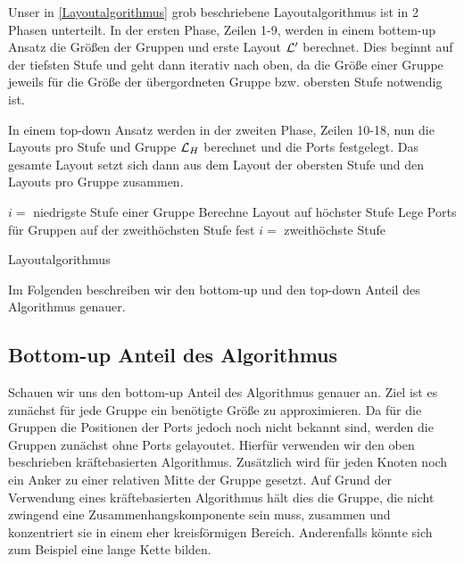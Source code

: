 Unser in \autoref{Layoutalgorithmus} grob beschriebene Layoutalgorithmus ist in 2 Phasen unterteilt. 
In der ersten Phase, Zeilen 1-9, werden in einem bottem-up Ansatz die Größen der Gruppen und erste Layout $\mathcal{L}'$ berechnet. 
Dies beginnt auf der tiefsten Stufe und geht dann iterativ nach oben, da die Größe einer Gruppe jeweils für die Größe der übergordneten Gruppe bzw. obersten Stufe notwendig ist.

In einem top-down Ansatz werden in der zweiten Phase, Zeilen 10-18, nun die Layouts pro Stufe und Gruppe $\mathcal{L}_H$ berechnet und die Ports festgelegt. Das gesamte Layout setzt 
sich dann aus dem Layout der obersten Stufe und den Layouts pro Gruppe zusammen.

\begin{algorithm}[H]
\label{Layoutalgorithmus}
\SetAlgoLined
{} %
$i =$ niedrigste Stufe einer Gruppe\;
Berechne Layout auf höchster Stufe\;
Lege Ports für Gruppen auf der zweithöchsten Stufe fest\;
$i =$ zweithöchste Stufe\; 
\caption{Layoutalgorithmus}
\end{algorithm}

Im Folgenden beschreiben wir den bottom-up und den top-down Anteil des Algorithmus genauer. 

\subsection{Bottom-up Anteil des Algorithmus}
Schauen wir uns den bottom-up Anteil des Algorithmus genauer an. Ziel ist es zunächst für jede Gruppe ein benötigte Größe zu approximieren.
Da für die Gruppen die Positionen der Ports jedoch noch nicht bekannt sind, werden die Gruppen zunächst ohne Ports gelayoutet.
Hierfür verwenden wir den oben beschrieben kräftebasierten Algorithmus. 
Zusätzlich wird  für jeden Knoten noch ein Anker zu einer relativen Mitte der Gruppe gesetzt. 
Auf Grund der Verwendung eines kräftebasierten Algorithmus hält dies die Gruppe, die nicht zwingend eine Zusammenhangskomponente sein muss, zusammen 
und konzentriert sie in einem eher kreisförmigen Bereich. Anderenfalls könnte sich zum Beispiel eine lange Kette bilden.

